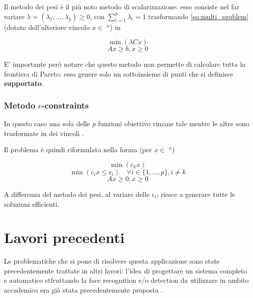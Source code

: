 Il metodo dei pesi è il più noto metodo di scalarizzazione: esso consiste nel far variare 
$\lambda = (\lambda_1, \dots, \lambda_p) \geq 0$, con $\sum_{i=1}^{p} \lambda_i = 1$ trasformando 
\ref{eq:multi_problem} (dotato dell'ulteriore vincolo $x \in$ \Zset$^n$) in 

\begin{equation*}
    \min (\lambda Cx)    
    \label{eq:}
\end{equation*}
\begin{equation*}
    Ax \geq b, x\geq 0
    \label{eq:}
\end{equation*}

E' importante però notare che questo metodo non permette di calcolare tutta la frontiera di Pareto:
esso genere solo un sottoinsieme di punti che si definisce \textbf{supportato}. 

\subsubsection{Metodo $\epsilon$-constraints}
\label{section:epsilon_constraints}

In questo caso una sola delle $p$ funzioni obiettivo rimane tale mentre le altre sono trasformate in 
dei vincoli \cite{Figueira2006}.

Il problema è quindi riformulato nella forma (per $x \in$ \Zset$^n$)

\begin{equation*}
    \min (c_kx)    
    \label{eq:}
\end{equation*}
\begin{equation*}
    \min (c_ix \leq \epsilon_i)  \quad \forall i \in \{1, \dots, p\}, i \neq k   
    \label{eq:}
\end{equation*}
\begin{equation*}
    Ax \geq 0, x \geq 0
    \label{eq:}
\end{equation*}

A differenza del metodo dei pesi, al variare delle $\epsilon_i$, riesce a generare tutte le soluzioni efficienti.

\newpage

\section{Lavori precedenti}
\label{section:past_works}

Le problematiche che si pone di risolvere questa applicazione sono state 
precedentemente trattate in altri lavori: l'idea di progettare un sistema 
completo e automatico stfruttando la face recognition e/o detection
da utilizzare in ambito accademico era già stata precedentemente proposta \cite{Kaw05}
\cite{Kotevski2018} \cite{Pat14} \cite{Sid16}.

